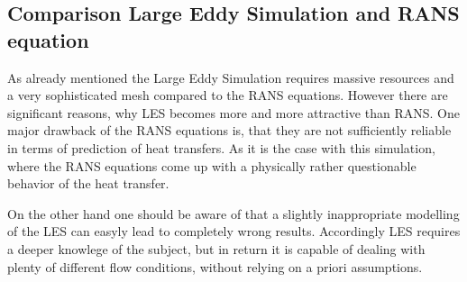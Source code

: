 \subsection{Comparison Large Eddy Simulation and RANS equation}
\label{ss:comparison}
As already mentioned the Large Eddy Simulation requires massive resources and a very sophisticated mesh compared to the RANS equations. However there are significant reasons, why LES becomes more and more attractive than RANS. One major drawback of the RANS equations is, that they are not sufficiently reliable in terms of prediction of heat transfers. As it is the case with this simulation, where the RANS equations come up with a physically rather questionable behavior of the heat transfer.

On the other hand one should be aware of that a slightly inappropriate modelling of the LES can easyly lead to completely wrong results. Accordingly LES requires a deeper knowlege of the subject, but in return it is capable of dealing with plenty of different flow conditions, without relying on a priori assumptions.

